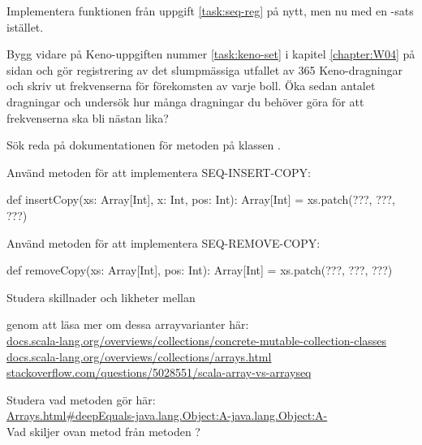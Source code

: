 \Task Implementera funktionen  från uppgift \ref{task:seq-reg} på nytt, men nu med en -sats istället.


\Task Bygg vidare på Keno-uppgiften nummer \ref{task:keno-set} i kapitel \ref{chapter:W04} på sidan \pageref{task:keno-set} och gör registrering av det slumpmässiga utfallet av 365 Keno-dragningar och skriv ut frekvenserna för förekomsten av varje boll. Öka sedan antalet dragningar och undersök hur många dragningar du behöver göra för att frekvenserna ska bli nästan lika?


\AdvancedTasks %

\Task Sök reda på dokumentationen för metoden  på klassen .

\Subtask Använd metoden  för att implementera SEQ-INSERT-COPY:
\begin{Code}
def insertCopy(xs: Array[Int], x: Int, pos: Int): Array[Int] =
  xs.patch(???, ???, ???)
\end{Code}

\Subtask Använd metoden  för att  implementera SEQ-REMOVE-COPY:
\begin{Code}
def removeCopy(xs: Array[Int], pos: Int): Array[Int] =
  xs.patch(???, ???, ???)
\end{Code}

\Task Studera skillnader och likheter mellan

\Subtask {}

\Subtask {}

\Subtask {}

\noindent genom att läsa mer om dessa arrayvarianter här: \\
\href{http://docs.scala-lang.org/overviews/collections/concrete-mutable-collection-classes}{docs.scala-lang.org/overviews/collections/concrete-mutable-collection-classes} \\
\href{http://docs.scala-lang.org/overviews/collections/arrays.html}{docs.scala-lang.org/overviews/collections/arrays.html}  \\
\href{http://stackoverflow.com/questions/5028551/scala-array-vs-arrayseq}{stackoverflow.com/questions/5028551/scala-array-vs-arrayseq}


\Task Studera vad metoden  gör här:\\
\href{https://docs.oracle.com/javase/8/docs/api/java/util/Arrays.html#deepEquals-java.lang.Object:A-java.lang.Object:A-}{Arrays.html\#deepEquals-java.lang.Object:A-java.lang.Object:A-} \\
Vad skiljer ovan metod från metoden ?

